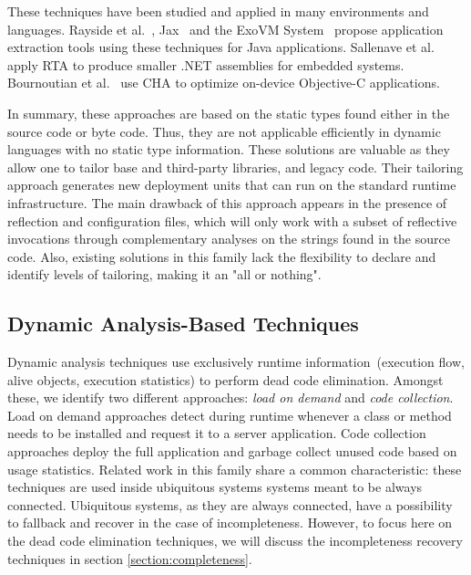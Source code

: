 These techniques have been studied and applied in many environments and languages. Rayside et al.~\cite{ShortRays02a}, Jax~\cite{ShortTip03a} and the ExoVM System~\cite{Titz06a} propose application extraction tools using these techniques for Java applications. Sallenave et al.~\cite{Sall10a} apply RTA to produce smaller .NET assemblies for embedded systems. Bournoutian et al.~\cite{Bour14a} use CHA to optimize on-device Objective-C applications.

In summary, these approaches are based on the static types found either in the source code or byte code. Thus, they are not applicable efficiently in dynamic languages with no static type information. These solutions are valuable as they allow one to tailor base and third-party libraries, and legacy code. Their tailoring approach generates new deployment units that can run on the standard runtime infrastructure. The main drawback of this approach appears in the presence of reflection and configuration files, which will only work with a subset of reflective invocations through complementary analyses on the strings found in the source code. Also, existing solutions in this family lack the flexibility to declare and identify levels of tailoring, making it an "all or nothing".


\subsection{Dynamic Analysis-Based Techniques}\label{section:dynamic_rw}

Dynamic analysis techniques use exclusively runtime information~(\ie execution flow, alive objects, execution statistics) to perform dead code elimination. Amongst these, we identify two different approaches: \emph{load on demand} and \emph{code collection}. Load on demand approaches detect during runtime whenever a class or method needs to be installed and request it to a server application. Code collection approaches deploy the full application  and garbage collect unused code based on usage statistics. Related work in this family share a common characteristic: these techniques are used inside ubiquitous systems \ie systems meant to be always connected. Ubiquitous systems, as they are always connected, have a possibility to fallback and recover in the case of incompleteness. However, to focus here on the dead code elimination techniques, we will discuss the incompleteness recovery techniques in section \ref{section:completeness}.

